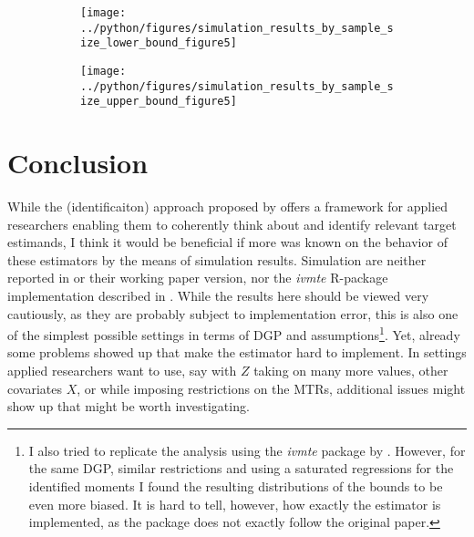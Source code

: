 \documentclass[11pt, a4paper, leqno]{article}
\begin{document}
\clearpage
\newpage

\begin{figure}[H][h!]
    \caption{Distribution of Estimator for $LATE(0.35, 0.9)$ by $N$ \label{fig:histos}}
     \centering

     \begin{subfigure}[b]{0.49\textwidth}
         \centering
         \texttt{[image: ../python/figures/simulation\_results\_by\_sample\_size\_lower\_bound\_figure5]}
     \end{subfigure}
    \hfill
     \begin{subfigure}[b]{0.49\textwidth}
         \centering
         \texttt{[image: ../python/figures/simulation\_results\_by\_sample\_size\_upper\_bound\_figure5]}
        \end{subfigure}


\end{figure}
\clearpage
\newpage

\section{Conclusion}
While the (identificaiton) approach proposed by \citet{mogstad2018using} offers a framework for applied researchers enabling them to coherently think about and identify relevant target estimands, I think it would be beneficial if more was known on the behavior of these estimators by the means of simulation results.
Simulation are neither reported in \citet{mogstad2018using} or their working paper version, nor the \textit{ivmte} R-package implementation described in \citet{shea2021ivmte}.
While the results here should be viewed very cautiously, as they are probably subject to implementation error, this is also one of the simplest possible settings in terms of DGP and assumptions\footnote{I also tried to replicate the analysis using the \textit{ivmte} package by \citet{shea2021ivmte}. However, for the same DGP, similar restrictions and using a saturated regressions for the identified moments I found the resulting distributions of the bounds to be even more biased. It is hard to tell, however, how exactly the estimator is implemented, as the package does not exactly follow the original \citet{mogstad2018using} paper.}. Yet, already some problems showed up that make the estimator hard to implement.
In settings applied researchers want to use, say with $Z$ taking on many more values, other covariates $X$, or while imposing restrictions on the MTRs, additional issues might show up that might be worth investigating.
\end{document}
